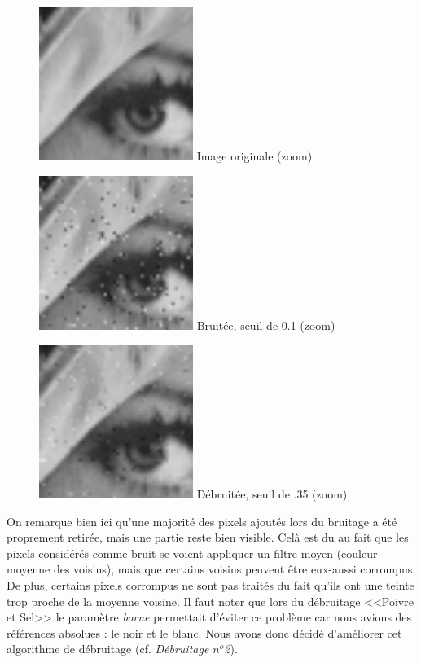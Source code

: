 \documentclass{article}
\begin{document}
		\begin{figure}[!ht]
			\centering
			\begin{minipage}[t]{5cm}
				\centering
				\includegraphics[width=5cm,height=5cm]{lenaZOOM.jpg}
				Image originale (zoom)
			\end{minipage}
			\begin{minipage}[t]{5cm}
				\centering
				\includegraphics[width=5cm,height=5cm]{Additive/algo1_10_ZOOM.jpg}
				Bruitée, seuil de 0.1 (zoom)
			\end{minipage}
			\begin{minipage}[t]{5cm}
				\centering
				\includegraphics[width=5cm,height=5cm]{Additive/unset_algo1_10_ZOOM.jpg}
				Débruitée, seuil de .35 (zoom)
			\end{minipage}
		\end{figure}
		On remarque bien ici qu'une majorité des pixels ajoutés lors du bruitage a été proprement retirée, mais une partie reste bien visible. Celà est du au fait que les pixels considérés comme bruit se voient appliquer un filtre moyen (couleur moyenne des voisins), mais que certains voisins peuvent être eux-aussi corrompus. De plus, certains pixels corrompus ne sont pas traités du fait qu'ils ont une teinte trop proche de la moyenne voisine. Il faut noter que lors du débruitage <<Poivre et Sel>> le paramètre \emph{borne} permettait d'éviter ce problème car nous avions des références absolues : le noir et le blanc. Nous avons donc décidé d'améliorer cet algorithme de débruitage (cf. \emph{Débruitage \begin{math}n^o\end{math}2}).\\\\
		
\end{document}
